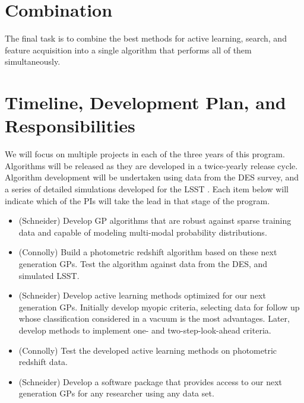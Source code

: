 \documentclass[prd,nofootbib,floatfix,11pt,tightenlines,nofootinbib]{revtex4}
\begin{document}
\section{Combination}

The final task is to combine the best methods for active learning, search,
and feature acquisition into a single algorithm that performs all of them
simultaneously.

\section{Timeline, Development Plan, and Responsibilities}

We will focus on multiple projects in each of the three years of this
program.  Algorithms will be released as they are developed in a
twice-yearly release cycle.  Algorithm development will be undertaken
using data from the DES survey, and  a series of detailed
simulations developed for the LSST \cite{connolly10}.  Each
item below will indicate which of the PIs will take the lead in that stage
of the program.

\vspace{.5\baselineskip}
\begin{itemize}

\item (Schneider) Develop GP algorithms that are robust against sparse training data and
capable of modeling multi-modal probability
distributions.  

\item (Connolly) Build a photometric redshift algorithm based on these next generation
GPs.  Test the algorithm against data from the DES, and simulated LSST.

\item (Schneider) Develop active learning methods optimized for our next generation GPs.
Initially develop myopic criteria, selecting data for follow up whose classification
considered in a vacuum is the most advantages.  Later, develop methods to implement
one- and two-step-look-ahead criteria.

\item (Connolly) Test the developed active learning methods on photometric redshift data.

\item (Schneider) 
Develop a software package that provides access to our next generation GPs for
any researcher using any data set.

\end{itemize}
\vspace{.5\baselineskip}
\end{document}
